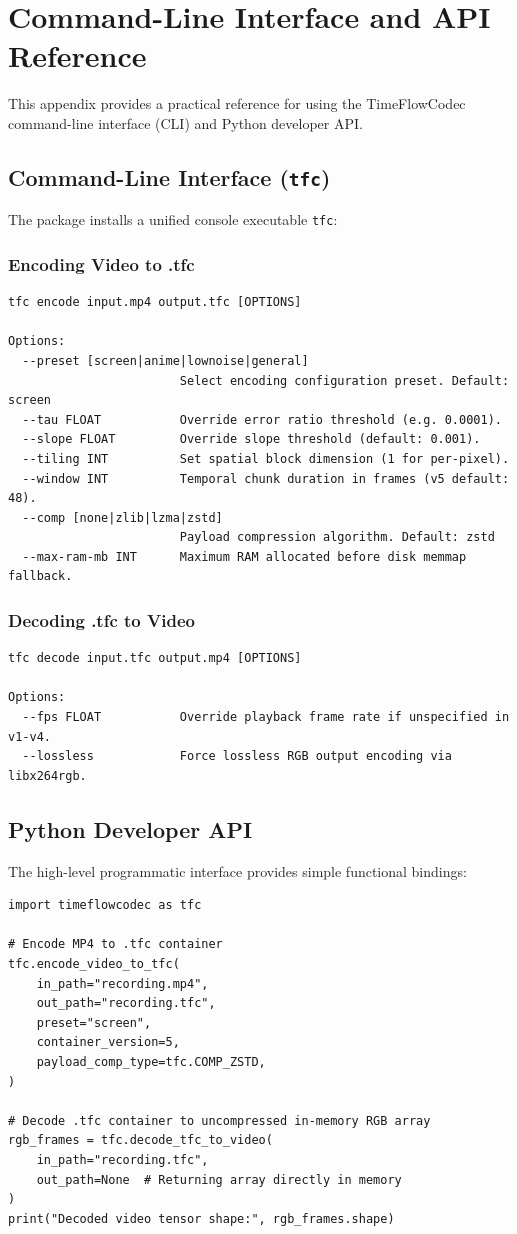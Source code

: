 \chapter{Command-Line Interface and API Reference}
\label{app:api}

This appendix provides a practical reference for using the TimeFlowCodec command-line interface (CLI) and Python developer API.

\section{Command-Line Interface (\texttt{tfc})}
The package installs a unified console executable \texttt{tfc}:

\subsection{Encoding Video to .tfc}
\begin{verbatim}
tfc encode input.mp4 output.tfc [OPTIONS]

Options:
  --preset [screen|anime|lownoise|general]
                        Select encoding configuration preset. Default: screen
  --tau FLOAT           Override error ratio threshold (e.g. 0.0001).
  --slope FLOAT         Override slope threshold (default: 0.001).
  --tiling INT          Set spatial block dimension (1 for per-pixel).
  --window INT          Temporal chunk duration in frames (v5 default: 48).
  --comp [none|zlib|lzma|zstd]
                        Payload compression algorithm. Default: zstd
  --max-ram-mb INT      Maximum RAM allocated before disk memmap fallback.
\end{verbatim}

\subsection{Decoding .tfc to Video}
\begin{verbatim}
tfc decode input.tfc output.mp4 [OPTIONS]

Options:
  --fps FLOAT           Override playback frame rate if unspecified in v1-v4.
  --lossless            Force lossless RGB output encoding via libx264rgb.
\end{verbatim}

\section{Python Developer API}
The high-level programmatic interface provides simple functional bindings:

\begin{verbatim}
import timeflowcodec as tfc

# Encode MP4 to .tfc container
tfc.encode_video_to_tfc(
    in_path="recording.mp4",
    out_path="recording.tfc",
    preset="screen",
    container_version=5,
    payload_comp_type=tfc.COMP_ZSTD,
)

# Decode .tfc container to uncompressed in-memory RGB array
rgb_frames = tfc.decode_tfc_to_video(
    in_path="recording.tfc",
    out_path=None  # Returning array directly in memory
)
print("Decoded video tensor shape:", rgb_frames.shape)
\end{verbatim}
